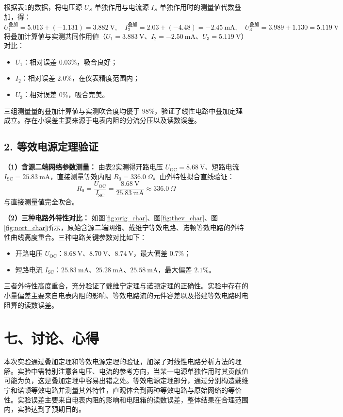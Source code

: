 \documentclass[10.5pt]{config}
\begin{document}
根据表1的数据，将电压源 $U_S$ 单独作用与电流源 $I_S$ 单独作用时的测量値代数叠加，得：
\begin{equation*}
    U_1^{\text{叠加}} = 5.013 + (-1.131) = 3.882\ \mathrm{V},\quad
    I_2^{\text{叠加}} = 2.03 + (-4.48) = -2.45\ \mathrm{mA},\quad
    U_3^{\text{叠加}} = 3.989 + 1.130 = 5.119\ \mathrm{V}
\end{equation*}
将叠加计算値与实测共同作用値（$U_1=3.883\ \mathrm{V}$、$I_2=-2.50\ \mathrm{mA}$、$U_3=5.119\ \mathrm{V}$）对比：
\begin{itemize}
    \item $U_1$：相对误差 $0.03\%$，吸合良好；
    \item $I_2$：相对误差 $2.0\%$，在仪表精度范围内；
    \item $U_3$：相对误差 $0\%$，吸合完美。
\end{itemize}
三组测量量的叠加计算値与实测吹合度均優于 $98\%$，验证了线性电路中叠加定理成立。存在小误差主要来源于电表内阻的分流分压以及读数误差。

\subsection*{2. 等效电源定理验证}

\textbf{（1）含源二端网络参数测量：}
由表2实测得开路电压 $U_{\mathrm{OC}} = 8.68\ \mathrm{V}$、短路电流 $I_{\mathrm{SC}} = 25.83\ \mathrm{mA}$，直接测量等效内阻 $R_0 = 336.0\ \Omega$。由外特性拟合直线验证：
\begin{equation*}
    R_0 = \frac{U_{\mathrm{OC}}}{I_{\mathrm{SC}}} = \frac{8.68\ \mathrm{V}}{25.83\ \mathrm{mA}} \approx 336.0\ \Omega
\end{equation*}
与直接测量値完全吹合。

\textbf{（2）三种电路外特性对比：}
如图\ref{fig:orig_char}、图\ref{fig:thev_char}、图\ref{fig:nort_char}所示，原始含源二端网络、戴维宁等效电路、诺顿等效电路的外特性曲线高度重合。三种电路关键参数对比如下：
\begin{itemize}
    \item 开路电压 $U_{\mathrm{OC}}$：$8.68\ \mathrm{V}$、$8.70\ \mathrm{V}$、$8.74\ \mathrm{V}$，最大偏差 $0.7\%$；
    \item 短路电流 $I_{\mathrm{SC}}$：$25.83\ \mathrm{mA}$、$25.28\ \mathrm{mA}$、$25.58\ \mathrm{mA}$，最大偏差 $2.1\%$。
\end{itemize}
三者外特性高度重合，充分验证了戴维宁定理与诺顿定理的正确性。实验中存在的小量偏差主要来自电表内阻的影响、等效电路流的元件容差以及搭建等效电路时电阻算的读数误差。

\section*{七、讨论、心得}

本次实验通过叠加定理和等效电源定理的验证，加深了对线性电路分析方法的理解。实验中需特别注意各电压、电流的参考方向，当某一电源单独作用时其贡献值可能为负，这是叠加定理中容易出错之处。等效电源定理部分，通过分别构造戴维宁和诺顿等效电路并测量其外特性，直观体会到两种等效电路与原始网络的等价性。实验误差主要来自电表内阻的影响和电阻箱的读数误差，整体结果在合理范围内，实验达到了预期目的。
\end{document}
